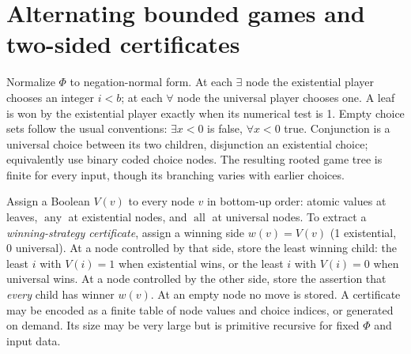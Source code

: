 \documentclass[11pt]{article}
\begin{document}
\section{Alternating bounded games and two-sided certificates}
Normalize $\Phi$ to negation-normal form. At each $\exists$ node the existential player chooses an integer $i<b$; at each $\forall$ node the universal player chooses one. A leaf is won by the existential player exactly when its numerical test is 1. Empty choice sets follow the usual conventions: $\exists x<0$ is false, $\forall x<0$ true. Conjunction is a universal choice between its two children, disjunction an existential choice; equivalently use binary coded choice nodes. The resulting rooted game tree is finite for every input, though its branching varies with earlier choices.

Assign a Boolean $V(v)$ to every node $v$ in bottom-up order: atomic values at leaves, $\operatorname{any}$ at existential nodes, and $\operatorname{all}$ at universal nodes. To extract a \emph{winning-strategy certificate}, assign a winning side $w(v)=V(v)$ (1 existential, 0 universal). At a node controlled by that side, store the least winning child: the least $i$ with $V(i)=1$ when existential wins, or the least $i$ with $V(i)=0$ when universal wins. At a node controlled by the other side, store the assertion that \emph{every} child has winner $w(v)$. At an empty node no move is stored. A certificate may be encoded as a finite table of node values and choice indices, or generated on demand. Its size may be very large but is primitive recursive for fixed $\Phi$ and input data.
\end{document}

